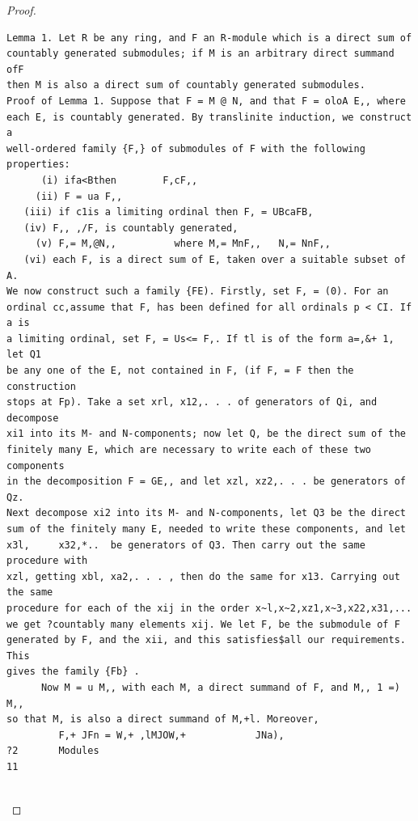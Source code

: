 \begin{proof}
\begin{verbatim}
Lemma 1. Let R be any ring, and F an R-module which is a direct sum of
countably generated submodules; if M is an arbitrary direct summand ofF
then M is also a direct sum of countably generated submodules.
Proof of Lemma 1. Suppose that F = M @ N, and that F = oloA E,, where
each E, is countably generated. By translinite induction, we construct a
well-ordered family {F,} of submodules of F with the following properties:
      (i) ifa<Bthen        F,cF,,
     (ii) F = ua F,,
   (iii) if c1is a limiting ordinal then F, = UBcaFB,
   (iv) F,, ,/F, is countably generated,
     (v) F,= M,@N,,          where M,= MnF,,   N,= NnF,,
   (vi) each F, is a direct sum of E, taken over a suitable subset of A.
We now construct such a family {FE). Firstly, set F, = (0). For an
ordinal cc,assume that F, has been defined for all ordinals p < CI. If a is
a limiting ordinal, set F, = Us<= F,. If tl is of the form a=,&+ 1, let Q1
be any one of the E, not contained in F, (if F, = F then the construction
stops at Fp). Take a set xrl, x12,. . . of generators of Qi, and decompose
xi1 into its M- and N-components; now let Q, be the direct sum of the
finitely many E, which are necessary to write each of these two components
in the decomposition F = GE,, and let xzl, xz2,. . . be generators of Qz.
Next decompose xi2 into its M- and N-components, let Q3 be the direct
sum of the finitely many E, needed to write these components, and let
x3l,     x32,*..  be generators of Q3. Then carry out the same procedure with
xzl, getting xbl, xa2,. . . , then do the same for x13. Carrying out the same
procedure for each of the xij in the order x~l,x~2,xz1,x~3,x22,x31,...
we get ?countably many elements xij. We let F, be the submodule of F
generated by F, and the xii, and this satisfies$all our requirements. This
gives the family {Fb} .
      Now M = u M,, with each M, a direct summand of F, and M,, 1 =) M,,
so that M, is also a direct summand of M,+l. Moreover,
         F,+ JFn = W,+ ,lMJOW,+            JNa),
?2       Modules                                                                11


\end{verbatim}
\end{proof}
